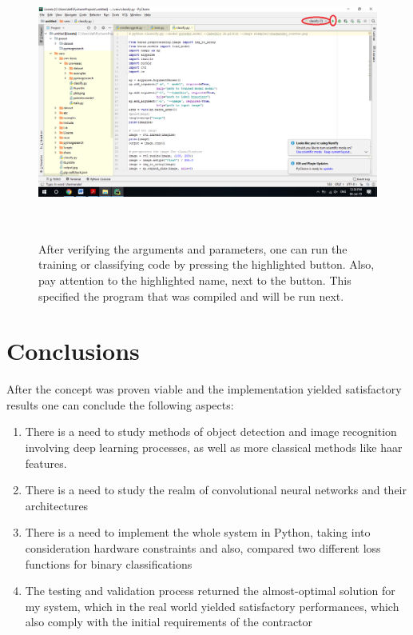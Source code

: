 \documentclass[12pt,a4paper,twoside]{report}
\begin{document}
\begin{figure}[h!]
	\centering
	\includegraphics[width=15cm, height=9cm]{img/data/imagerun4.png}
	\caption[]
	{After verifying the arguments and parameters, one can run the training or classifying code by pressing the highlighted button. Also, pay attention to the highlighted name, next to the button. This specified the program that was compiled and will be run next.}
	\label{fig:imagerun4}
\end{figure}


\chapter{Conclusions}
\label{ch:conclusions}


After the concept was proven viable and the implementation yielded satisfactory results one can conclude the following aspects:
\begin{enumerate}
\item There is a need to study methods of object detection and image recognition involving deep learning processes, as well as more classical methods like haar features.
\item There is a need to study the realm of convolutional neural networks and their architectures
\item There is a need to implement the whole system in Python, taking into consideration hardware constraints and also, compared two different loss functions for binary classifications
\item The testing and validation process returned the almost-optimal solution for my system, which in the real world yielded satisfactory performances, which also comply with the initial requirements of the contractor
\end{enumerate}
\end{document}
